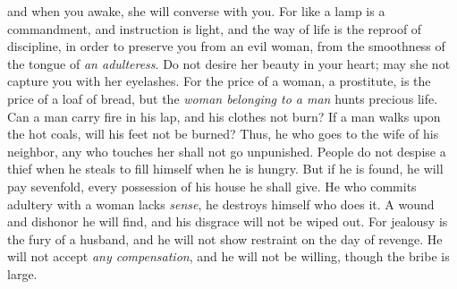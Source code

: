 \begin{biblechapter}
and when you awake, she will converse with you.
\verse For like a lamp is a commandment, and instruction is light, 
and the way of life is the reproof of discipline,
\verse in order to preserve you from an evil woman, 
from the smoothness of the tongue of \textit{an adulteress}.
\verse Do not desire her beauty in your heart; 
may she not capture you with her eyelashes.
\verse For the price of a woman, a prostitute, is the price of a loaf of bread, 
but the \textit{woman belonging to a man} hunts precious life.
 Can a man carry fire in his lap, 
and his clothes not burn?
\verse If a man walks upon the hot coals, 
will his feet not be burned?
\verse Thus, he who goes to the wife of his neighbor, 
any who touches her shall not go unpunished.
\verse People do not despise a thief when he steals 
to fill himself when he is hungry.
\verse But if he is found, he will pay sevenfold, 
every possession of his house he shall give.
\verse He who commits adultery with a woman lacks \textit{sense}, 
he destroys himself who does it.
\verse A wound and dishonor he will find, 
and his disgrace will not be wiped out.
\verse For jealousy is the fury of a husband, 
and he will not show restraint on the day of revenge.
\verse He will not accept \textit{any compensation}, 
and he will not be willing, though the bribe is large.
\end{biblechapter}

